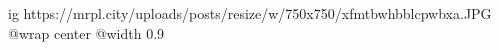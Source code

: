  
 
 
 
 

\ifcmt
  ig https://mrpl.city/uploads/posts/resize/w/750x750/xfmtbwhbblcpwbxa.JPG
  @wrap center
  @width 0.9
\fi
